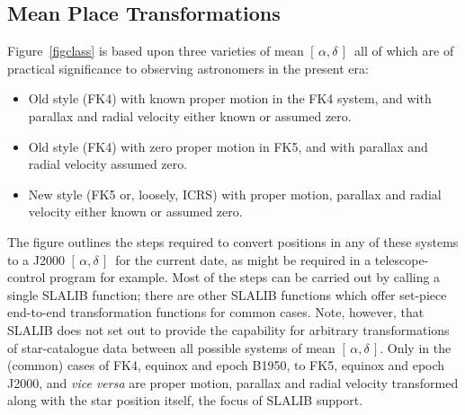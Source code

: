 \documentclass[11pt,fleqn,twoside]{article}
\renewcommand{\_}{{\tt\char'137}}     %
\newcommand{\radec}     {$[\,\alpha,\delta\,]$}
\begin{document}
\subsection{Mean Place Transformations}
Figure~\ref{figclass}
is based upon three varieties of mean \radec\ all of which are
of practical significance to observing astronomers in the present era:
\begin{itemize}
   \item Old style (FK4) with known proper motion in the FK4
         system, and with parallax and radial velocity either
         known or assumed zero.
   \item Old style (FK4) with zero proper motion in FK5,
         and with parallax and radial velocity assumed zero.
   \item New style (FK5 or, loosely, ICRS)
         with proper motion, parallax and
         radial velocity either known or assumed zero.
\end{itemize}
The figure outlines the steps required to convert positions in
any of these systems to a J2000 \radec\ for the current
date, as might be required in a telescope-control
program for example.
Most of the steps can be carried out by calling a single
SLALIB function;  there are other SLALIB functions which
offer set-piece end-to-end transformation functions for common cases.
Note, however, that SLALIB does not set out to provide the capability
for arbitrary transformations of star-catalogue data
between all possible systems of mean \radec.
Only in the (common) cases of FK4, equinox and epoch B1950,
to FK5, equinox and epoch J2000, and {\it vice versa}\/ are
proper motion, parallax and radial velocity transformed
along with the star position itself, the
focus of SLALIB support.
\end{document}

